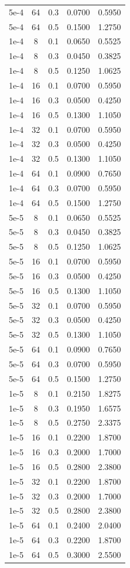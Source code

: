 \begin{longtable}{ccccc}
    5e-4 & 64 & 0.3 & 0.0700 & 0.5950 \\
    5e-4 & 64 & 0.5 & 0.1500 & 1.2750 \\
    1e-4 & 8 & 0.1 & 0.0650 & 0.5525 \\
    1e-4 & 8 & 0.3 & 0.0450 & 0.3825 \\
    1e-4 & 8 & 0.5 & 0.1250 & 1.0625 \\
    1e-4 & 16 & 0.1 & 0.0700 & 0.5950 \\
    1e-4 & 16 & 0.3 & 0.0500 & 0.4250 \\
    1e-4 & 16 & 0.5 & 0.1300 & 1.1050 \\
    1e-4 & 32 & 0.1 & 0.0700 & 0.5950 \\
    1e-4 & 32 & 0.3 & 0.0500 & 0.4250 \\
    1e-4 & 32 & 0.5 & 0.1300 & 1.1050 \\
    1e-4 & 64 & 0.1 & 0.0900 & 0.7650 \\
    1e-4 & 64 & 0.3 & 0.0700 & 0.5950 \\
    1e-4 & 64 & 0.5 & 0.1500 & 1.2750 \\
    5e-5 & 8 & 0.1 & 0.0650 & 0.5525 \\
    5e-5 & 8 & 0.3 & 0.0450 & 0.3825 \\
    5e-5 & 8 & 0.5 & 0.1250 & 1.0625 \\
    5e-5 & 16 & 0.1 & 0.0700 & 0.5950 \\
    5e-5 & 16 & 0.3 & 0.0500 & 0.4250 \\
    5e-5 & 16 & 0.5 & 0.1300 & 1.1050 \\
    5e-5 & 32 & 0.1 & 0.0700 & 0.5950 \\
    5e-5 & 32 & 0.3 & 0.0500 & 0.4250 \\
    5e-5 & 32 & 0.5 & 0.1300 & 1.1050 \\
    5e-5 & 64 & 0.1 & 0.0900 & 0.7650 \\
    5e-5 & 64 & 0.3 & 0.0700 & 0.5950 \\
    5e-5 & 64 & 0.5 & 0.1500 & 1.2750 \\
    1e-5 & 8 & 0.1 & 0.2150 & 1.8275 \\
    1e-5 & 8 & 0.3 & 0.1950 & 1.6575 \\
    1e-5 & 8 & 0.5 & 0.2750 & 2.3375 \\
    1e-5 & 16 & 0.1 & 0.2200 & 1.8700 \\
    1e-5 & 16 & 0.3 & 0.2000 & 1.7000 \\
    1e-5 & 16 & 0.5 & 0.2800 & 2.3800 \\
    1e-5 & 32 & 0.1 & 0.2200 & 1.8700 \\
    1e-5 & 32 & 0.3 & 0.2000 & 1.7000 \\
    1e-5 & 32 & 0.5 & 0.2800 & 2.3800 \\
    1e-5 & 64 & 0.1 & 0.2400 & 2.0400 \\
    1e-5 & 64 & 0.3 & 0.2200 & 1.8700 \\
    1e-5 & 64 & 0.5 & 0.3000 & 2.5500 \\
\end{longtable}

